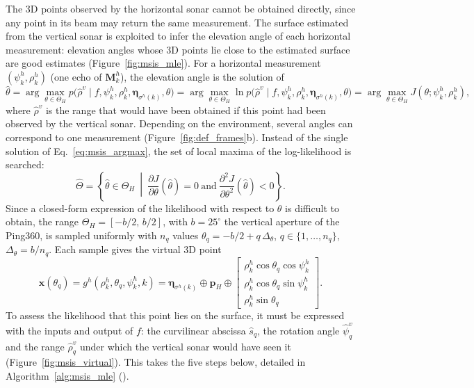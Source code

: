 The 3D points observed by the horizontal sonar cannot be obtained directly, since any point in its
beam may return the same measurement. The surface estimated from the vertical sonar is exploited to
infer the elevation angle of each horizontal measurement: elevation angles whose 3D points lie close
to the estimated surface are good estimates (Figure~\ref{fig:msis_mle}). For a horizontal measurement
$(\psi^h_k, \rho^h_k)$ (one echo of $\mathbf{M}^h_k$), the elevation angle is the solution of
\begin{equation}                         %
  \hat{\theta} = \arg\max_{\theta \in \Theta_H} p\big(\hat{\rho}^v \mid f, \psi^h_k, \rho^h_k,
  \boldsymbol{\eta}_{\sigma^h(k)}, \theta\big)
  = \arg\max_{\theta \in \Theta_H} \ln p\big(\hat{\rho}^v \mid f, \psi^h_k, \rho^h_k,
  \boldsymbol{\eta}_{\sigma^h(k)}, \theta\big)
  = \arg\max_{\theta \in \Theta_H} J(\theta; \psi^h_k, \rho^h_k),
  \label{eq:msis_argmax}
\end{equation}
where $\hat{\rho}^v$ is the range that would have been obtained if this point had been observed by
the vertical sonar. Depending on the environment, several angles can correspond to one measurement
(Figure~\ref{fig:def_frames}b). Instead of the single solution of Eq.~\eqref{eq:msis_argmax}, the
set of local maxima of the log-likelihood is searched:
\begin{equation}                         %
  \hat{\Theta} = \left\{ \hat{\theta} \in \Theta_H \ \middle|\ \frac{\partial J}{\partial\theta}(\hat{\theta}) = 0
  \ \text{and}\ \frac{\partial^2 J}{\partial\theta^2}(\hat{\theta}) < 0 \right\}.
  \label{eq:msis_localmax}
\end{equation}
Since a closed-form expression of the likelihood with respect to $\theta$ is difficult to obtain, the
range $\Theta_H = [-b/2,\, b/2]$, with $b = 25^\circ$ the vertical aperture of the Ping360, is
sampled uniformly with $n_q$ values $\theta_q = -b/2 + q\,\Delta_\theta$, $q \in \{1,\dots,n_q\}$,
$\Delta_\theta = b / n_q$. Each sample gives the virtual 3D point
\begin{equation}                         %
  \mathbf{x}(\theta_q) = g^h(\rho^h_k, \theta_q, \psi^h_k, k)
  = \boldsymbol{\eta}_{\sigma^h(k)} \oplus \mathbf{p}_H \oplus
  \begin{bmatrix} \rho^h_k\cos\theta_q\cos\psi^h_k \\ \rho^h_k\cos\theta_q\sin\psi^h_k \\ \rho^h_k\sin\theta_q \end{bmatrix}.
  \label{eq:msis_candidate}
\end{equation}
To assess the likelihood that this point lies on the surface, it must be expressed with the inputs
and output of $f$: the curvilinear abscissa $\hat{s}_q$, the rotation angle $\hat{\psi}^v_q$ and the
range $\hat{\rho}^v_q$ under which the vertical sonar would have seen it
(Figure~\ref{fig:msis_virtual}). This takes the five steps below, detailed in
Algorithm~\ref{alg:msis_mle} ().

